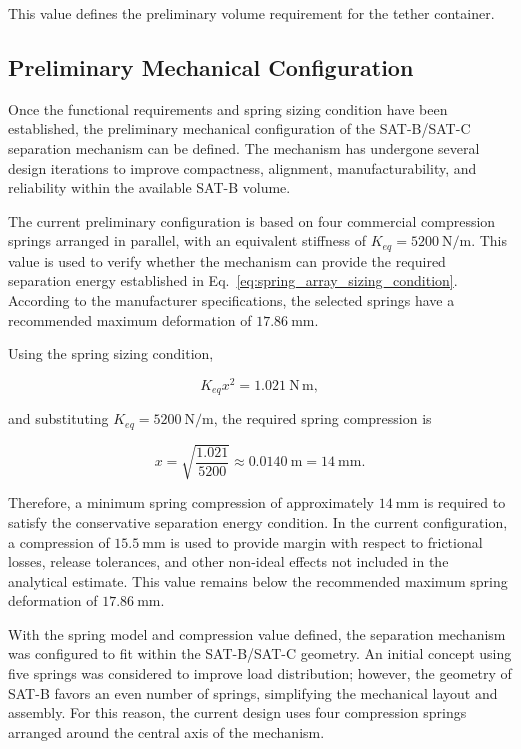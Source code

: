 This value defines the preliminary volume requirement for the tether container.

\subsection{Preliminary Mechanical Configuration}
\label{sub:preliminary_mechanical_configuration}

Once the functional requirements and spring sizing condition have been established, the preliminary mechanical configuration of the SAT-B/SAT-C separation mechanism can be defined. The mechanism has undergone several design iterations to improve compactness, alignment, manufacturability, and reliability within the available SAT-B volume.

The current preliminary configuration is based on four commercial compression springs arranged in parallel, with an equivalent stiffness of \(K_{eq}=5200~\mathrm{N/m}\). This value is used to verify whether the mechanism can provide the required separation energy established in Eq.~\eqref{eq:spring_array_sizing_condition}. According to the manufacturer specifications, the selected springs have a recommended maximum deformation of \(17.86~\mathrm{mm}\).

Using the spring sizing condition,

\begin{equation}
K_{eq}x^2 = 1.021~\mathrm{N\,m},
\label{eq:mechanical_config_spring_condition}
\end{equation}

and substituting \(K_{eq}=5200~\mathrm{N/m}\), the required spring compression is

\begin{equation}
x =
\sqrt{\frac{1.021}{5200}}
\approx
0.0140~\mathrm{m}
=
14~\mathrm{mm}.
\label{eq:required_spring_compression}
\end{equation}

Therefore, a minimum spring compression of approximately \(14~\mathrm{mm}\) is required to satisfy the conservative separation energy condition. In the current configuration, a compression of \(15.5~\mathrm{mm}\) is used to provide margin with respect to frictional losses, release tolerances, and other non-ideal effects not included in the analytical estimate. This value remains below the recommended maximum spring deformation of \(17.86~\mathrm{mm}\).

With the spring model and compression value defined, the separation mechanism was configured to fit within the SAT-B/SAT-C geometry. An initial concept using five springs was considered to improve load distribution; however, the geometry of SAT-B favors an even number of springs, simplifying the mechanical layout and assembly. For this reason, the current design uses four compression springs arranged around the central axis of the mechanism.

